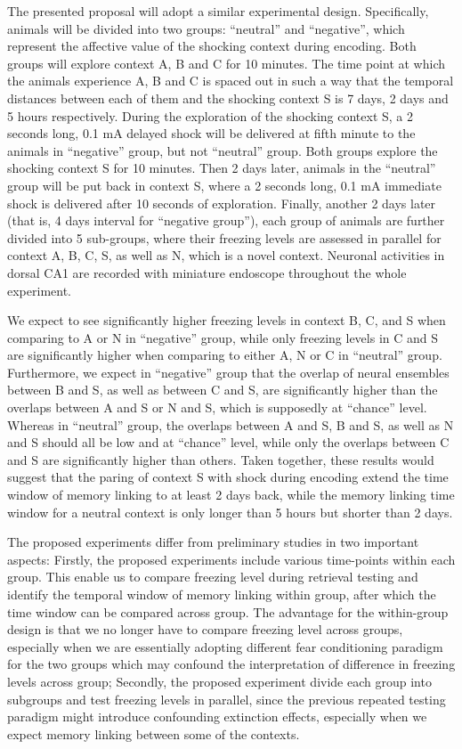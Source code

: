 \documentclass[master.tex]{subfiles}
\begin{document}
The presented proposal will adopt a similar experimental design. Specifically,
animals will be divided into two groups: ``neutral'' and ``negative'', which
represent the affective value of the shocking context during encoding. Both
groups will explore context A, B and C for 10 minutes. The time point at which
the animals experience A, B and C is spaced out in such a way that the temporal
distances between each of them and the shocking context S is 7 days, 2 days and
5 hours respectively. During the exploration of the shocking context S, a 2
seconds long, 0.1 mA delayed shock will be delivered at fifth minute to the
animals in ``negative'' group, but not ``neutral'' group. Both groups explore
the shocking context S for 10 minutes. Then 2 days later, animals in the
``neutral'' group will be put back in context S, where a 2 seconds long, 0.1 mA
immediate shock is delivered after 10 seconds of exploration. Finally, another 2
days later (that is, 4 days interval for ``negative group''), each group of
animals are further divided into 5 sub-groups, where their freezing levels are
assessed in parallel for context A, B, C, S, as well as N, which is a novel
context. Neuronal activities in dorsal CA1 are recorded with miniature
endoscope throughout the whole experiment.

We expect to see significantly higher freezing levels in context B, C, and S
when comparing to A or N in ``negative'' group, while only freezing levels in C
and S are significantly higher when comparing to either A, N or C in ``neutral''
group. Furthermore, we expect in ``negative'' group that the overlap of neural
ensembles between B and S, as well as between C and S, are significantly higher
than the overlaps between A and S or N and S, which is supposedly at ``chance''
level. Whereas in ``neutral'' group, the overlaps between A and S, B and S, as
well as N and S should all be low and at ``chance'' level, while only the
overlaps between C and S are significantly higher than others. Taken together,
these results would suggest that the paring of context S with shock during
encoding extend the time window of memory linking to at least 2 days back, while
the memory linking time window for a neutral context is only longer than 5 hours
but shorter than 2 days.

The proposed experiments differ from preliminary studies in two important
aspects: Firstly, the proposed experiments include various time-points within
each group. This enable us to compare freezing level during retrieval testing
and identify the temporal window of memory linking within group, after which the
time window can be compared across group. The advantage for the within-group
design is that we no longer have to compare freezing level across groups,
especially when we are essentially adopting different fear conditioning paradigm
for the two groups which may confound the interpretation of difference in
freezing levels across group; Secondly, the proposed experiment divide each
group into subgroups and test freezing levels in parallel, since the previous
repeated testing paradigm might introduce confounding extinction effects,
especially when we expect memory linking between some of the contexts.
\end{document}
